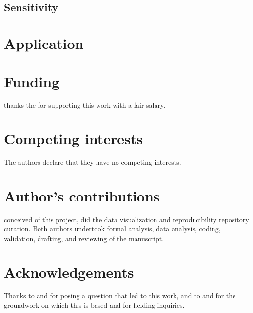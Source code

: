 \documentclass{bmcart}
\begin{document}
\subsection{Sensitivity}

\section{Application}


\pagebreak


\begin{backmatter}

\section*{Funding}
   thanks the  for supporting this work with a fair salary. 
  
\section*{Competing interests}
  The authors declare that they have no competing interests.

\section*{Author's contributions}
   conceived of this project, did the data visualization and reproducibility repository curation. Both authors undertook formal analysis, data analysis, coding, validation, drafting, and reviewing of the manuscript. 

\section*{Acknowledgements}
   Thanks to  and  for posing a question that led to this work, and to  and  for the groundwork on which this is based and for fielding inquiries.


\end{backmatter}
\end{document}
